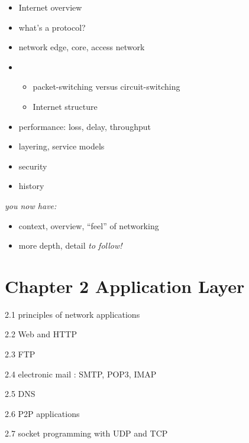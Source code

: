 \documentclass[
]{article}
\begin{document}
\begin{itemize}
\item
  Internet overview
\item
  what's a protocol?
\item
  network edge, core, access network
\item
  \begin{itemize}
  \item
    packet-switching versus circuit-switching
  \item
    Internet structure
  \end{itemize}
\item
  performance: loss, delay, throughput
\item
  layering, service models
\item
  security
\item
  history
\end{itemize}

\emph{you now have:}

\begin{itemize}
\item
  context, overview, ``feel'' of networking
\item
  more depth, detail \emph{to follow!}
\end{itemize}

\hypertarget{chapter-2-application-layer}{%
\section{Chapter 2 Application
Layer}\label{chapter-2-application-layer}}

2.1 principles of network applications

2.2 Web and HTTP

2.3 FTP

2.4 electronic mail : SMTP, POP3, IMAP

2.5 DNS

2.6 P2P applications

2.7 socket programming with UDP and TCP
\end{document}
